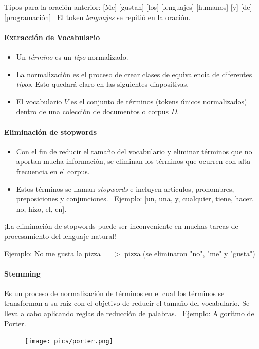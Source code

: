 \documentclass{book}
\begin{document}
Tipos para la oración anterior: [Me] [gustan] [los] [lenguajes] [humanos] [y] [de] [programación] \
El token \emph{lenguajes} se repitió en la oración.

\paragraph{Extracción de Vocabulario}

\begin{itemize}
\item Un \emph{término} es un \emph{tipo} normalizado.
\item La normalización es el proceso de crear clases de equivalencia de diferentes \emph{tipos}. Esto quedará claro en las siguientes diapositivas.
\item El vocabulario $V$ es el conjunto de términos (tokens únicos normalizados) dentro de una colección de documentos o corpus $D$.
\end{itemize}

\paragraph{Eliminación de stopwords}
\begin{itemize}
\item Con el fin de reducir el tamaño del vocabulario y eliminar términos que no aportan mucha información, se eliminan los términos que ocurren con alta frecuencia en el corpus.
\item Estos términos se llaman \emph{stopwords} e incluyen artículos, pronombres, preposiciones y conjunciones. \
Ejemplo: [un, una, y, cualquier, tiene, hacer, no, hizo, el, en].
\end{itemize}

¡La eliminación de stopwords puede ser inconveniente en muchas tareas de procesamiento del lenguaje natural!

Ejemplo: No me gusta la pizza $=>$ pizza (se eliminaron "no", "me" y "gusta")

\paragraph{Stemming}

Es un proceso de normalización de términos en el cual los términos se transforman a su raíz con el objetivo de reducir el tamaño del vocabulario. Se lleva a cabo aplicando reglas de reducción de palabras. \
Ejemplo: Algoritmo de Porter.

\begin{figure}[h!]
\centering
\texttt{[image: pics/porter.png]}
\end{figure}
\end{document}
